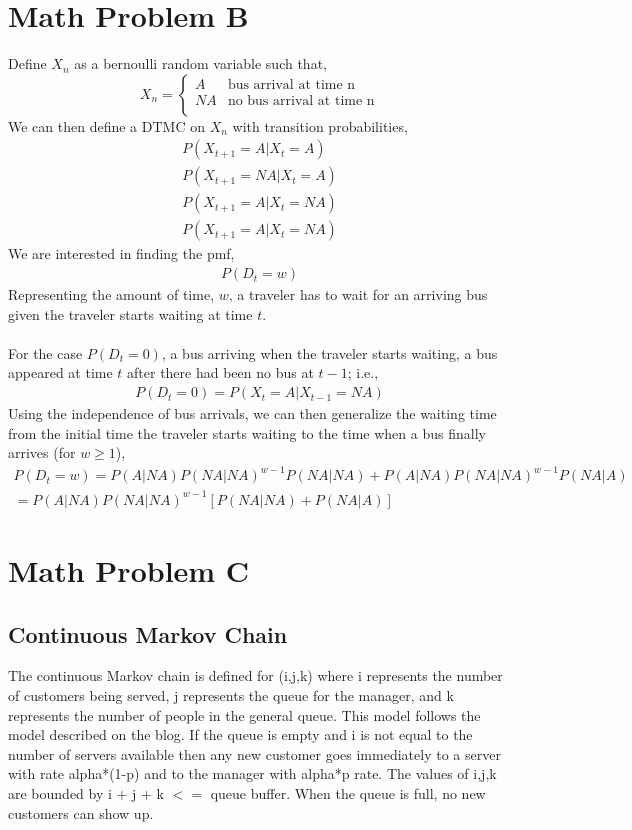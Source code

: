 \documentclass[10pt,a4paper]{article}
\begin{document}
\section{Math Problem B}
Define $X_n$ as a bernoulli random variable such that,
\[X_n = \begin{cases} 
A & \text{bus arrival at time n} \\
NA & \text{no bus arrival at time n} \\
\end{cases}\]
We can then define a DTMC on \(X_n\) with transition probabilities,
\begin{gather*}
P(X_{t+1}=A|X_t=A)\\
P(X_{t+1}=NA|X_t=A)\\
P(X_{t+1}=A|X_t=NA)\\
P(X_{t+1}=A|X_t=NA)
\end{gather*}
We are interested in finding the pmf,
\begin{align*}
P(D_t=w)
\end{align*}
Representing the amount of time, $w$, a traveler has to wait for an arriving
bus given the traveler starts waiting at time $t$.\\
\\
For the case $P(D_t=0)$, a bus arriving when the traveler starts waiting, a bus appeared at time $t$ after there had been no bus at $t-1$; i.e.,
\begin{align*}
P(D_t=0)=P(X_t=A|X_{t-1}=NA)
\end{align*}
Using the independence of bus arrivals, we can then generalize the waiting
time from the initial time the traveler starts waiting to the time when a
bus finally arrives (for \(w\geq1\)),
\begin{gather*}
P(D_t=w)=P(A|NA)P(NA|NA)^{w-1}P(NA|NA)+P(A|NA)P(NA|NA)^{w-1}P(NA|A)\\
=P(A|NA)P(NA|NA)^{w-1}[P(NA|NA)+P(NA|A)]
\end{gather*}
\section{Math Problem C}
\subsection{Continuous Markov Chain}
The continuous Markov chain is defined for (i,j,k) where i represents the number of customers being served, j represents the queue for the manager, and k represents the number of people in the general queue. This model follows the model described on the blog. If the queue is empty and i is not equal to the number of servers available then any new customer goes immediately to a server with rate alpha*(1-p) and to the manager with alpha*p rate. The values of i,j,k are bounded by i + j + k $<=$ queue buffer. When the queue is full, no new customers can show up.
\end{document}
